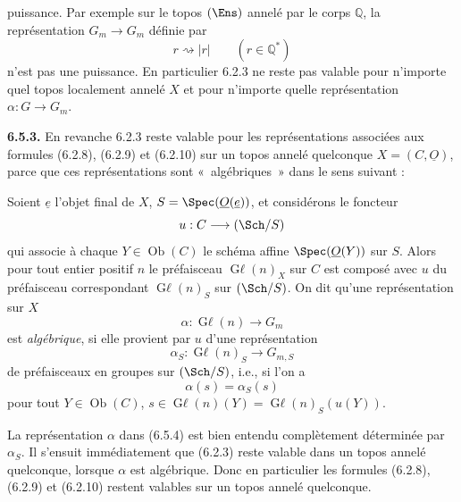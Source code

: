 
puissance. Par exemple sur le topos \((\Ens)\) annelé par le corps \(\mathbb Q\), la représentation \(G_m\to G_m\) définie par
\[
 r\rightsquigarrow|r|\qquad(r\in\mathbb Q^*)
\]
n'est pas une puissance. En particulier 6.2.3 ne reste pas valable pour n'importe quel topos localement annelé \(X\) et pour n'importe quelle représentation \(\alpha:G\to G_m\).

\textbf{6.5.3.} En revanche 6.2.3 reste valable pour les représentations associées aux formules (6.2.8), (6.2.9) et (6.2.10) sur un topos annelé quelconque \(X=({C},\underline{O})\), parce que ces représentations sont «~algébriques~» dans le sens suivant :

Soient \(\underline{e}\) l'objet final de \(X\), \(S=\Spec(\underline{O}(\underline{e}))\), et considérons le foncteur
\[
 u:{C}\longrightarrow(\Sch/S)
\]
qui associe à chaque \(Y\in\operatorname{Ob}({C})\) le schéma affine \(\Spec(\underline{O}(Y))\) sur \(S\). Alors pour tout entier positif \(n\) le préfaisceau \(\operatorname{G\ell}(n)_X\) sur \({C}\) est composé avec \(u\) du préfaisceau correspondant \(\operatorname{G\ell}(n)_S\) sur \((\Sch/S)\). On dit qu'une représentation sur \(X\)
\begin{equation}\tag{6.5.4}
 \alpha:\operatorname{G\ell}(n)\longrightarrow G_m
\end{equation}
est \emph{algébrique}, si elle provient par \(u\) d'une représentation
\begin{equation}\tag{6.5.5}
 \alpha_S:\operatorname{G\ell}(n)_S\longrightarrow G_{m,S}
\end{equation}
de préfaisceaux en groupes sur \((\Sch/S)\), i.e., si l'on a
\[
 \alpha(s)=\alpha_S(s)
\]
pour tout \(Y\in\operatorname{Ob}({C})\), \(s\in\operatorname{G\ell}(n)(Y)=\operatorname{G\ell}(n)_S(u(Y))\).

La représentation \(\alpha\) dans (6.5.4) est bien entendu complètement déterminée par \(\alpha_S\). Il s'ensuit immédiatement que (6.2.3) reste valable dans un topos annelé quelconque, lorsque \(\alpha\) est algébrique. Donc en particulier les formules (6.2.8), (6.2.9) et (6.2.10) restent valables sur un topos annelé quelconque.

